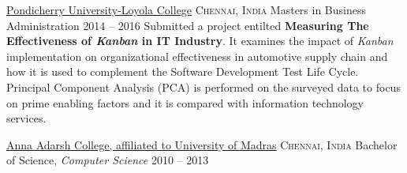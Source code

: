 
\headedsection
  {\href{http://www.loyolacollege.edu/pulc/}{Pondicherry University-Loyola College}}
  {\textsc{Chennai, India}} {%
  \headedsubsection
    {Masters in Business Administration}
    {2014 -- 2016}
    { 
    \vspace{0.4em}
    Submitted a project entilted \textbf{ Measuring The Effectiveness of \emph{Kanban} in IT Industry}.
    It examines the impact of \emph{Kanban} implementation on organizational effectiveness in automotive supply chain and how it is used to complement the Software Development Test Life Cycle. Principal Component Analysis (PCA) is performed on the surveyed data to focus on prime enabling factors and it is compared with information technology services.
    }
}

\headedsection
  {\href{http://www.annaadarsh.edu.in/}{Anna Adarsh College, affiliated to University of Madras}}
  {\textsc{Chennai, India}} {%
  \headedsubsection
    {Bachelor of Science, \textnormal{\emph{Computer Science}}}
    {2010 -- 2013}
    {} 
}